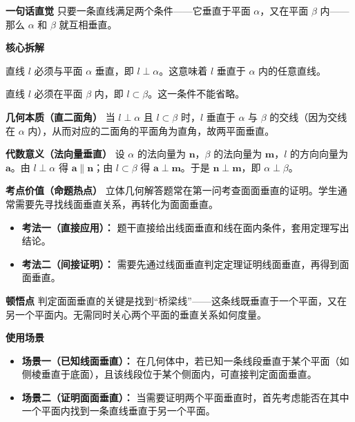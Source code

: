 \begin{explanationbox}
	\textbf{\textcolor{CExplanation}{一句话直觉}}
	只要一条直线满足两个条件——它垂直于平面 $\alpha$，又在平面 $\beta$ 内——那么 $\alpha$ 和 $\beta$ 就互相垂直。

	\medskip
	\textbf{\textcolor{CExplanation}{核心拆解}}
	\begin{description}[style=nextline, leftmargin=2.8em, labelsep=0.5em, itemsep=0.45em]
		\item[\textbf{要点一（线面垂直）：}]
			直线 $l$ 必须与平面 $\alpha$ 垂直，即 $l\perp\alpha$。这意味着 $l$ 垂直于 $\alpha$ 内的任意直线。
		\item[\textbf{要点二（线在面内）：}]
			直线 $l$ 必须在平面 $\beta$ 内，即 $l\subset\beta$。这一条件不能省略。
	\end{description}

	\medskip
	\textbf{\textcolor{CExplanation}{几何本质（直二面角）}}
	当 $l\perp\alpha$ 且 $l\subset\beta$ 时，$l$ 垂直于 $\alpha$ 与 $\beta$ 的交线（因为交线在 $\alpha$ 内），从而对应的二面角的平面角为直角，故两平面垂直。

	\medskip
	\textbf{\textcolor{CExplanation}{代数意义（法向量垂直）}}
	设 $\alpha$ 的法向量为 $\boldsymbol{n}$，$\beta$ 的法向量为 $\boldsymbol{m}$，$l$ 的方向向量为 $\boldsymbol{a}$。由 $l\perp\alpha$ 得 $\boldsymbol{a}\parallel\boldsymbol{n}$；由 $l\subset\beta$ 得 $\boldsymbol{a}\perp\boldsymbol{m}$。于是 $\boldsymbol{n}\perp\boldsymbol{m}$，即 $\alpha\perp\beta$。

	\medskip
	\textbf{\textcolor{CExplanation}{考点价值（命题热点）}}
	立体几何解答题常在第一问考查面面垂直的证明。学生通常需要先寻找线面垂直关系，再转化为面面垂直。
	\begin{itemize}[leftmargin=*, itemsep=0.5em, topsep=0.4em]
		\item \textbf{考法一（直接应用）：} 题干直接给出线面垂直和线在面内条件，套用定理写出结论。
		\item \textbf{考法二（间接证明）：} 需要先通过线面垂直判定定理证明线面垂直，再得到面面垂直。
	\end{itemize}

	\medskip
	\textbf{\textcolor{CExplanation}{顿悟点}}
	判定面面垂直的关键是找到“桥梁线”——这条线既垂直于一个平面，又在另一个平面内。无需同时关心两个平面的垂直关系如何度量。

	\medskip
	\textbf{\textcolor{CExplanation}{使用场景}}
	\begin{itemize}[leftmargin=*, itemsep=0.5em, topsep=0.4em]
		\item \textbf{场景一（已知线面垂直）：} 在几何体中，若已知一条线段垂直于某个平面（如侧棱垂直于底面），且该线段位于某个侧面内，可直接判定面面垂直。
		\item \textbf{场景二（证明面面垂直）：} 当需要证明两个平面垂直时，首先考虑能否在其中一个平面内找到一条直线垂直于另一个平面。
	\end{itemize}

\end{explanationbox}

